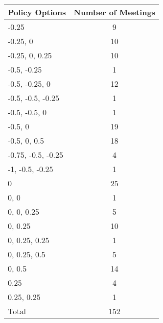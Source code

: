 \begin{tabular}{lc}
\hline\hline 
\addlinespace 
Policy Options & Number of Meetings \\ 
\hline 
-0.25 & 9 \\
-0.25, 0 & 10 \\
-0.25, 0, 0.25 & 10 \\
-0.5, -0.25 & 1 \\
-0.5, -0.25, 0 & 12 \\
-0.5, -0.5, -0.25 & 1 \\
-0.5, -0.5, 0 & 1 \\
-0.5, 0 & 19 \\
-0.5, 0, 0.5 & 18 \\
-0.75, -0.5, -0.25 & 4 \\
-1, -0.5, -0.25 & 1 \\
0 & 25 \\
0, 0 & 1 \\
0, 0, 0.25 & 5 \\
0, 0.25 & 10 \\
0, 0.25, 0.25 & 1 \\
0, 0.25, 0.5 & 5 \\
0, 0.5 & 14 \\
0.25 & 4 \\
0.25, 0.25 & 1 \\
\addlinespace 
Total & 152 \\
\hline 
\end{tabular}